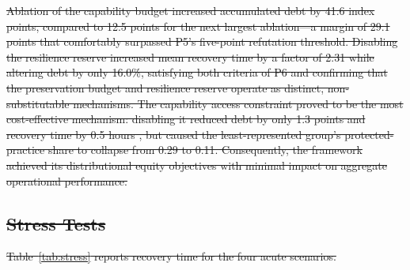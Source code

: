 \documentclass[utf8]{FrontiersinHarvard}
\providecommand{\DIFdel}[1]{{\protect\color{red}\sout{#1}}}                      %
\begin{document}
\DIFdel{Ablation of the capability budget increased accumulated debt by 41.6 index points, compared to 12.5 points for the next largest ablation---a margin of 29.1 points that comfortably surpassed P5's five-point refutation threshold. Disabling the resilience reserve increased mean recovery time by a factor of 2.31 while altering debt by only 16.0\%, satisfying both criteria of P6 and confirming that the preservation budget and resilience reserve operate as distinct, non-substitutable mechanisms. The capability access constraint proved to be the most cost-effective mechanism: disabling it reduced debt by only 1.3 points and recovery time by 0.5 hours , but caused the least-represented group's protected-practice share to collapse from 0.29 to 0.11. Consequently, the framework achieved its distributional equity objectives with minimal impact on aggregate operational performance.
	}%


\subsection{\DIFdel{Stress Tests}}
\addtocounter{subsection}{-1}%

\DIFdel{Table~\ref{tab:stress} reports recovery time for the four acute scenarios.
	}%
\end{document}
